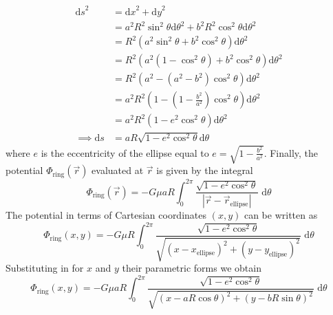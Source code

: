 \begin{align}
    {\mathrm{d}s}^{2}    & = {\mathrm{d}x}^{2} + {\mathrm{d}y}^{2} \nonumber                                                      \\
                         & = a^2R^2\sin^2{\theta} {\mathrm{d}\theta}^2 + b^2R^2\cos^2{\theta} {\mathrm{d}\theta}^2 \nonumber      \\
                         & = R^2\left(a^2\sin^2{\theta} + b^2\cos^2{\theta}\right) {\mathrm{d}\theta}^2 \nonumber                 \\
                         & = R^2\left(a^2\left(1 - \cos^2{\theta}\right)+ b^2\cos^2{\theta}\right) {\mathrm{d}\theta}^2 \nonumber \\
                         & = R^2\left(a^2 - (a^2 - b^2)\cos^2{\theta}\right) {\mathrm{d}\theta}^2 \nonumber                       \\
                         & = a^2R^2\left(1 - \left(1 - \frac{b^2}{a^2}\right)\cos^2{\theta}\right) {\mathrm{d}\theta}^2 \nonumber \\
                         & = a^2R^2 \left(1 - e^2\cos^2{\theta}\right) {\mathrm{d}\theta}^2 \nonumber                             \\
    \implies \mathrm{d}s & = aR\sqrt{1 - e^2\cos^2{\theta}} \mathrm{d}\theta
\end{align}
where \( e \) is the eccentricity of the ellipse equal to \( e = \sqrt{1 - \frac{b^2}{a^2}} \).
Finally, the potential \( \Phi_{\text{ring}}(\vec{r}) \) evaluated at \( \vec{r} \) is given by the integral
\begin{equation}
    \Phi_{\text{ring}}(\vec{r}) = -G \mu a R \int_{0}^{2\pi} \frac{\sqrt{1 - e^2\cos^2{\theta}}}{\left|\vec{r} - \vec{r}_{\text{ellipse}}\right|} \,\,{} \mathrm{d}\theta
\end{equation}
The potential in terms of Cartesian coordinates \( (x, y) \) can be written as
\begin{equation}
    \Phi_{\text{ring}}(x, y) = -G \mu R \int_{0}^{2\pi} \frac{\sqrt{1 - e^2\cos^2{\theta}}}{\sqrt{{(x - x_{\text{ellipse}})}^{2} + {(y - y_{\text{ellipse}})}^{2}}} \,\,{} \mathrm{d}\theta
\end{equation}
Substituting in for \( x \) and \( y \) their parametric forms we obtain
\begin{equation}
    \Phi_{\text{ring}}(x, y) = -G \mu a R \int_{0}^{2\pi} \frac{\sqrt{1 - e^2\cos^2{\theta}}}{\sqrt{{(x - aR\cos{\theta})}^{2} + {(y - bR\sin{\theta})}^{2}}} \,\,{} \mathrm{d}\theta
\end{equation}
